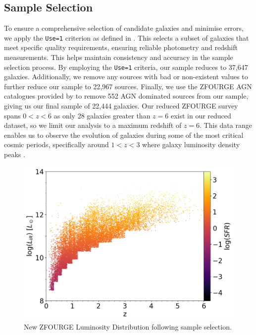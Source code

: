 \subsection{Sample Selection}
To ensure a comprehensive selection of candidate galaxies and minimise errors, we apply the \texttt{Use=1} criterion as defined in \cite{straatman_fourstar_2016}. This selects a subset of galaxies that meet specific quality requirements, ensuring reliable photometry and redshift measurements. This helps maintain consistency and accuracy in the sample selection process. By employing the \texttt{Use=1} criteria, our sample reduces to 37,647 galaxies. Additionally, we remove any sources with bad or non-existent values to further reduce our sample to 22,967 sources. Finally, we use the ZFOURGE AGN catalogues provided by \cite{cowley_zfourge_2016} to remove 552 AGN dominated sources from our sample, giving us our final sample of 22,444 galaxies. Our reduced ZFOURGE survey spans $0<z<6$ as only 28 galaxies greater than $z=6$ exist in our reduced dataset, so we limit our analysis to a maximum redshift of $z=6$. This data range enables us to observe the evolution of galaxies during some of the most critical cosmic periods, specifically around $1 < z < 3$ \citep{gruppioni_modelling_2011, wylezalek_galaxy_2014} where galaxy luminosity density peaks \citep{assef_mid-ir-_2011}. 



\begin{figure}[t]
    \centering
    \includegraphics[width=\linewidth]{Figures/ZFOURGE Luminosity Distribution.png}
    \caption{New ZFOURGE Luminosity Distribution following sample selection.}
    \label{Fig: New ZFOURGE Luminosity Distribution}
\end{figure}

